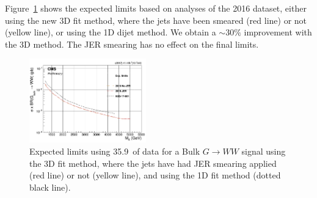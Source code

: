 Figure~\ref{fig:limitsCompare} shows the expected limits based on analyses of the 2016 dataset, either using the new 3D fit method, where the jets have been smeared (red line) or not (yellow line), or using the 1D dijet method. We obtain a $\sim30\%$ improvement with the 3D method. The JER smearing has no effect on the final limits.
\begin{figure}[h!]
\centering
\includegraphics[width=0.45\textwidth]{figures/analysis/search3/AN-17-303/limits/limits_BulkGWW_compare.png}
\caption{Expected limits using 35.9~\fbinv of data for a Bulk $G\rightarrow WW$ signal using the 3D fit method, where the jets have had JER smearing applied (red line) or not (yellow line), and using the 1D fit method (dotted black line).}
\label{fig:limitsCompare}
\end{figure}
\clearpage
